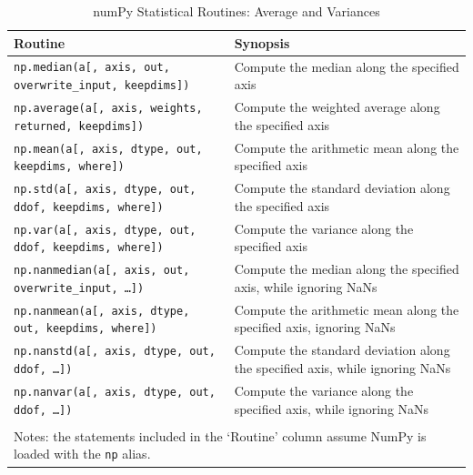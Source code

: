\documentclass[a4paper,11pt]{book}
\begin{document}
\begin{table}
	\centering
	\caption{numPy Statistical Routines: Average and Variances}
	\label{tab:average_and_variances}
	\begin{tabular}{ll}
		\toprule \toprule
			Routine & Synopsis \\
			\midrule
                        \texttt{np.median(a[, axis, out, overwrite\_input, keepdims])}&
                        Compute the median along the specified axis\\
                        \texttt{np.average(a[, axis, weights, returned, keepdims])}&
                        Compute the weighted average along the specified axis\\
                        \texttt{np.mean(a[, axis, dtype, out, keepdims, where])}&
                        Compute the arithmetic mean along the specified axis\\
                        \texttt{np.std(a[, axis, dtype, out, ddof, keepdims, where])}&
                        Compute the standard deviation along the specified axis\\
                        \texttt{np.var(a[, axis, dtype, out, ddof, keepdims, where])}&
                        Compute the variance along the specified axis\\
                        \texttt{np.nanmedian(a[, axis, out, overwrite\_input, \ldots])}&
                        Compute the median along the specified axis, while ignoring NaNs\\
                        \texttt{np.nanmean(a[, axis, dtype, out, keepdims, where])}&
                        Compute the arithmetic mean along the specified axis, ignoring NaNs\\
                        \texttt{np.nanstd(a[, axis, dtype, out, ddof, \ldots])}&
                        Compute the standard deviation along the specified axis, while ignoring NaNs\\
                        \texttt{np.nanvar(a[, axis, dtype, out, ddof, \ldots])}&
                        Compute the variance along the specified axis, while ignoring NaNs\\
	     	\bottomrule \\[-1.8ex]
	        \multicolumn{2}{l}{Notes: the statements included in the `Routine' column assume NumPy is loaded with the \texttt{np} alias.} \\
	\end{tabular}
\end{table}
\end{document}

